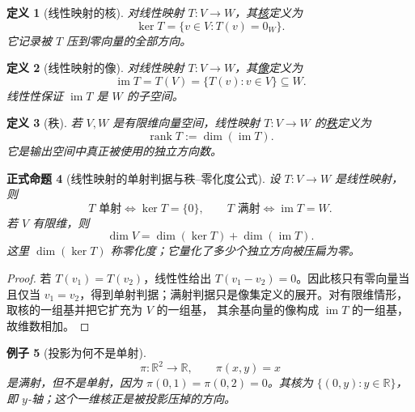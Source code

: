 \documentclass[UTF8,fontset=none,a4paper,11pt]{ctexart}
\theoremstyle{foundation-definition}
\newtheorem{definition}{定义}[section]
\theoremstyle{foundation-theorem}
\theoremstyle{foundation-proposition}
\newtheorem{proposition}[definition]{正式命题}
\theoremstyle{foundation-example}
\newtheorem{example}[definition]{例子}
\theoremstyle{foundation-remark}
\theoremstyle{foundation-theorem}
\newcommand{\term}[2]{\hyperref[#1]{#2}}
\begin{document}
\begin{definition}[线性映射的核]\label{def:linear-kernel}
对线性映射 \(T:V\to W\)，其\term{def:linear-kernel}{核}定义为
\[
\ker T=\{v\in V:T(v)=0_W\}.
\]
它记录被 \(T\) 压到零向量的全部方向。
\end{definition}

\begin{definition}[线性映射的像]\label{def:linear-image}
对线性映射 \(T:V\to W\)，其\term{def:linear-image}{像}定义为
\[
\operatorname{im}T=T(V)=\{T(v):v\in V\}\subseteq W.
\]
线性性保证 \(\operatorname{im}T\) 是 \(W\) 的子空间。
\end{definition}

\begin{definition}[秩]\label{def:linear-rank}
若 \(V,W\) 是有限维向量空间，线性映射 \(T:V\to W\) 的\term{def:linear-rank}{秩}定义为
\[
\operatorname{rank}T:=\dim(\operatorname{im}T).
\]
它是输出空间中真正被使用的独立方向数。
\end{definition}

\begin{proposition}[线性映射的单射判据与秩--零化度公式]\label{prop:linear-rank-nullity}
设 \(T:V\to W\) 是线性映射，则
\[
T\text{ 单射}\Longleftrightarrow\ker T=\{0\},\qquad
T\text{ 满射}\Longleftrightarrow\operatorname{im}T=W.
\]
若 \(V\) 有限维，则
\[
\dim V=\dim(\ker T)+\dim(\operatorname{im}T).
\]
这里 \(\dim(\ker T)\) 称零化度；它量化了多少个独立方向被压扁为零。
\end{proposition}

\begin{proof}
若 \(T(v_1)=T(v_2)\)，线性性给出 \(T(v_1-v_2)=0\)。因此核只有零向量当且仅当
\(v_1=v_2\)，得到单射判据；满射判据只是像集定义的展开。对有限维情形，取核的一组基并把它扩充为 \(V\) 的一组基，
其余基向量的像构成 \(\operatorname{im}T\) 的一组基，故维数相加。
\end{proof}

\begin{example}[投影为何不是单射]
\[
\pi:\mathbb R^2\to\mathbb R,\qquad \pi(x,y)=x
\]
是满射，但不是单射，因为 \(\pi(0,1)=\pi(0,2)=0\)。其核为
\(\{(0,y):y\in\mathbb R\}\)，即 \(y\)-轴；这个一维核正是被投影压掉的方向。
\end{example}
\end{document}
